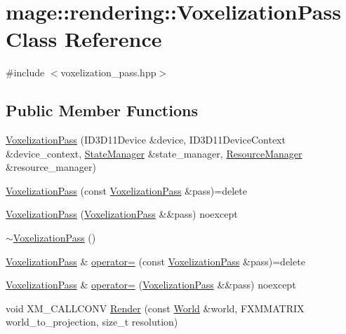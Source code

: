 \hypertarget{classmage_1_1rendering_1_1_voxelization_pass}{}\section{mage\+:\+:rendering\+:\+:Voxelization\+Pass Class Reference}
\label{classmage_1_1rendering_1_1_voxelization_pass}


{\ttfamily \#include $<$voxelization\+\_\+pass.\+hpp$>$}

\subsection*{Public Member Functions}
\begin{DoxyCompactItemize}
\item 
\hyperlink{classmage_1_1rendering_1_1_voxelization_pass_a5ffb9a465e954b6795bc49dfdd8a21d8}{Voxelization\+Pass} (I\+D3\+D11\+Device \&device, I\+D3\+D11\+Device\+Context \&device\+\_\+context, \hyperlink{classmage_1_1rendering_1_1_state_manager}{State\+Manager} \&state\+\_\+manager, \hyperlink{classmage_1_1rendering_1_1_resource_manager}{Resource\+Manager} \&resource\+\_\+manager)
\item 
\hyperlink{classmage_1_1rendering_1_1_voxelization_pass_a74f9898700c2d2877ec663fe23a85670}{Voxelization\+Pass} (const \hyperlink{classmage_1_1rendering_1_1_voxelization_pass}{Voxelization\+Pass} \&pass)=delete
\item 
\hyperlink{classmage_1_1rendering_1_1_voxelization_pass_abbdf28fc21b6b4fe4eebf8ed02ac015d}{Voxelization\+Pass} (\hyperlink{classmage_1_1rendering_1_1_voxelization_pass}{Voxelization\+Pass} \&\&pass) noexcept
\item 
\hyperlink{classmage_1_1rendering_1_1_voxelization_pass_ab989ce6ec60745d7339a1288554dd400}{$\sim$\+Voxelization\+Pass} ()
\item 
\hyperlink{classmage_1_1rendering_1_1_voxelization_pass}{Voxelization\+Pass} \& \hyperlink{classmage_1_1rendering_1_1_voxelization_pass_a30bf15dac8660764cd1342a4f397e47e}{operator=} (const \hyperlink{classmage_1_1rendering_1_1_voxelization_pass}{Voxelization\+Pass} \&pass)=delete
\item 
\hyperlink{classmage_1_1rendering_1_1_voxelization_pass}{Voxelization\+Pass} \& \hyperlink{classmage_1_1rendering_1_1_voxelization_pass_ac7beb95fbf6fd85355703854ac282e91}{operator=} (\hyperlink{classmage_1_1rendering_1_1_voxelization_pass}{Voxelization\+Pass} \&\&pass) noexcept
\item 
void X\+M\+\_\+\+C\+A\+L\+L\+C\+O\+NV \hyperlink{classmage_1_1rendering_1_1_voxelization_pass_a29854c8eeb03975172a56ff6c61f1b60}{Render} (const \hyperlink{classmage_1_1rendering_1_1_world}{World} \&world, F\+X\+M\+M\+A\+T\+R\+IX world\+\_\+to\+\_\+projection, size\+\_\+t resolution)
\end{DoxyCompactItemize}
